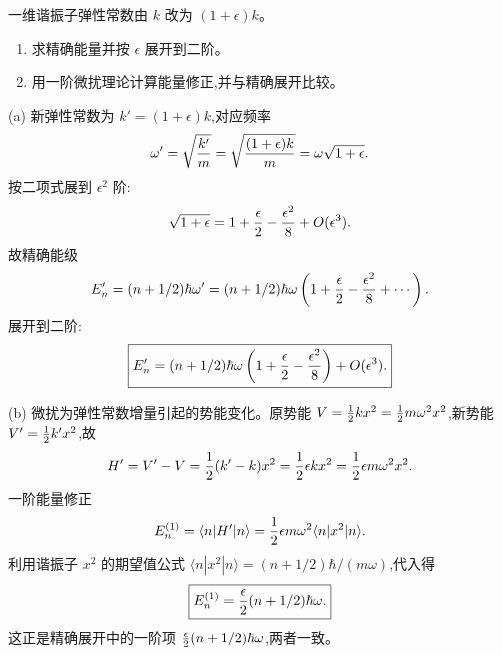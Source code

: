 \begin{question}
一维谐振子弹性常数由 $k$ 改为 $(1+\epsilon)k$。
\begin{enumerate}
\item 求精确能量并按 $\epsilon$ 展开到二阶。
\item 用一阶微扰理论计算能量修正,并与精确展开比较。
\end{enumerate}
\end{question}
\begin{solution}
(a) 新弹性常数为 $k'=(1+\epsilon)k$,对应频率
\[
\omega'=\sqrt{k'\over m}=\sqrt{(1+\epsilon)k\over m}
=\omega\sqrt{1+\epsilon}.
\]
按二项式展到 $\epsilon^2$ 阶:
\[
\sqrt{1+\epsilon}=1+{\epsilon\over2}-{\epsilon^2\over8}+O(\epsilon^3).
\]
故精确能级
\[
E_n'=(n+1/2)\hbar\omega'
=(n+1/2)\hbar\omega\left(1+{\epsilon\over2}-{\epsilon^2\over8}+\cdots\right).
\]
展开到二阶:
\[
\boxed{E_n'=(n+1/2)\hbar\omega\left(1+{\epsilon\over2}-{\epsilon^2\over8}\right)+O(\epsilon^3).}
\]

(b) 微扰为弹性常数增量引起的势能变化。原势能 $V={1\over2}kx^2={1\over2}m\omega^2x^2$,新势能 $V'={1\over2}k'x^2$,故
\[
H'=V'-V={1\over2}(k'-k)x^2={1\over2}\epsilon kx^2={1\over2}\epsilon m\omega^2x^2.
\]
一阶能量修正
\[
E_n^{(1)}=\langle n|H'|n\rangle={1\over2}\epsilon m\omega^2\langle n|x^2|n\rangle.
\]
利用谐振子 $x^2$ 的期望值公式 $\langle n|x^2|n\rangle=(n+1/2)\hbar/(m\omega)$,代入得
\[
\boxed{E_n^{(1)}={\epsilon\over2}(n+1/2)\hbar\omega.}
\]
这正是精确展开中的一阶项 ${\epsilon\over2}(n+1/2)\hbar\omega$,两者一致。
\end{solution}


